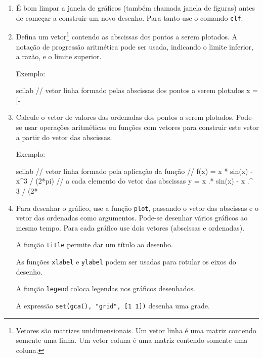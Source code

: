 \documentclass[11pt,fleqn]{practice}
\begin{document}
\begin{enumerate}
  \item É bom limpar a janela de gráficos (também chamada janela de
  figuras) antes de começar a construir um novo desenho. Para tanto use
  o comando \texttt{clf}.

  \item Defina um vetor\footnote{Vetores são matrizes
    unidimensionais. Um vetor linha é uma matriz contendo somente uma
    linha. Um vetor coluna é uma matriz contendo somente uma coluna.}
  contendo as abscissas dos pontos a serem plotados. A notação de
  progressão aritmética pode ser usada, indicando o limite inferior, a
  razão, e o limite superior.

   Exemplo:
   \begin{lst}{scilab}
// vetor linha formado pelas abscissas dos pontos a serem plotados
x = [-%
   \end{lst}

   \item Calcule o vetor de valores das ordenadas dos pontos a serem
   plotados. Pode-se usar operações aritméticas ou funções com vetores
   para construir este vetor a partir do vetor das abscissas.

   Exemplo:
   \begin{lst}{scilab}
// vetor linha formado pela aplicação da função
// f(x) = x * sin(x) - x^3 / (2*pi)
// a cada elemento do vetor das abscissas
y = x .* sin(x) - x .^ 3 / (2*%
   \end{lst}

   \item Para desenhar o gráfico, use a função \texttt{plot}, passando o
   vetor das abscissas e o vetor das ordenadas como argumentos. Pode-se
   desenhar vários gráficos ao mesmo tempo. Para cada gráfico use dois
   vetores (abscissas e ordenadas).

   A função \texttt{title} permite dar um título ao desenho.

   As funções \texttt{xlabel} e \texttt{ylabel} podem ser usadas para
   rotular os eixos do desenho.

   A função \texttt{legend} coloca legendas nos gráficos desenhados.

   A expressão \texttt{set(gca(), "grid", [1 1])} desenha uma grade.


\end{enumerate}
\end{document}
